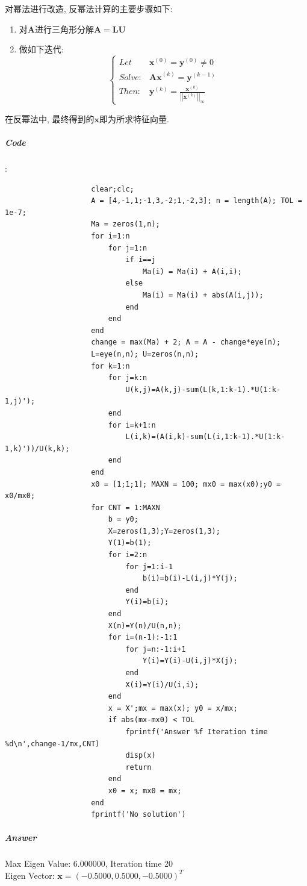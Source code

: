 \documentclass{article}
\begin{document}
\begin{CJK*}{UTF8}{song}
					对幂法进行改造, 反幂法计算的主要步骤如下:
					\begin{enumerate}
						\item 对$\mathbf{A}$进行三角形分解$\mathbf{A}=\mathbf{LU}$
						\item 做如下迭代:
						$$\left\{
							\begin{aligned}
								Let\  &\mathbf{x}^{\left(0\right)} = \mathbf{y}^{\left(0\right)} \neq 0 \\
								Solve: &\mathbf{Ax}^{\left(k\right)} = \mathbf{y}^{\left(k-1\right)} \\
								Then: &\mathbf{y}^{\left(k\right)} = \frac{\mathbf{x}^{\left(k\right)}}{\left| \left|\mathbf{x}^{\left(k\right)} \right|\right|_{\infty}}
							\end{aligned}
						\right.$$
					\end{enumerate}
					在反幂法中, 最终得到的$\mathbf{x}$即为所求特征向量.
				\subparagraph{Code}
					:\newline
					\begin{lstlisting}
					clear;clc;
					A = [4,-1,1;-1,3,-2;1,-2,3]; n = length(A); TOL = 1e-7;
					Ma = zeros(1,n);
					for i=1:n
						for j=1:n
							if i==j
								Ma(i) = Ma(i) + A(i,i);
							else
								Ma(i) = Ma(i) + abs(A(i,j));
							end
						end
					end
					change = max(Ma) + 2; A = A - change*eye(n);
					L=eye(n,n); U=zeros(n,n);
					for k=1:n
						for j=k:n
							U(k,j)=A(k,j)-sum(L(k,1:k-1).*U(1:k-1,j)');
						end
						for i=k+1:n
							L(i,k)=(A(i,k)-sum(L(i,1:k-1).*U(1:k-1,k)'))/U(k,k);
						end
					end
					x0 = [1;1;1]; MAXN = 100; mx0 = max(x0);y0 = x0/mx0;
					for CNT = 1:MAXN
						b = y0;
						X=zeros(1,3);Y=zeros(1,3);
						Y(1)=b(1);
						for i=2:n    
							for j=1:i-1
								b(i)=b(i)-L(i,j)*Y(j);
							end
							Y(i)=b(i);
						end
						X(n)=Y(n)/U(n,n);
						for i=(n-1):-1:1
							for j=n:-1:i+1
								Y(i)=Y(i)-U(i,j)*X(j);
							end
							X(i)=Y(i)/U(i,i);
						end
						x = X';mx = max(x); y0 = x/mx;
						if abs(mx-mx0) < TOL
							fprintf('Answer %f Iteration time %d\n',change-1/mx,CNT)
							disp(x)
							return
						end
						x0 = x; mx0 = mx;
					end
					fprintf('No solution')
					\end{lstlisting}
				\subparagraph{Answer}
					 Max Eigen Value: 6.000000, Iteration time 20 \\
					 Eigen Vector: $\mathbf{x} = \left(-0.5000,0.5000 ,-0.5000\right)^T$
					\begin{figure}[H]
					 	\centering

\end{figure}
\end{CJK*}
\end{document}
